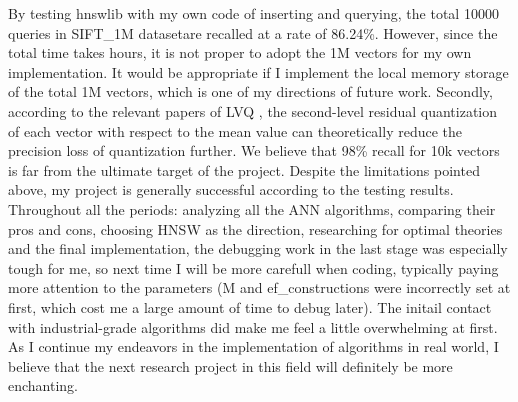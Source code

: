 \documentclass[sigconf, nonacm]{acmart}
\begin{document}
By testing hnswlib with my own code of inserting and querying, the total 10000 queries in SIFT\_1M datasetare recalled at a rate of 86.24\%. However, since the total time takes hours, it is not proper to adopt the 1M vectors for my own implementation. It would be appropriate if I implement the local memory storage of the total 1M vectors, which is one of my directions of future work.
Secondly, according to the relevant papers of LVQ \cite{aguerrebere2023similarity}, the second-level residual quantization of each vector with respect to the mean value can theoretically reduce the precision loss of quantization further. We believe that 98\% recall for 10k vectors is far from the ultimate target of the project.
Despite the limitations pointed above, my project is generally successful according to the testing results. Throughout all the periods: analyzing all the ANN algorithms, comparing their pros and cons, choosing HNSW as the direction, researching for optimal theories and the final implementation, the debugging work in the last stage was especially tough for me, so next time I will be more carefull when coding, typically paying more attention to the parameters (M and ef\_constructions were incorrectly set at first, which cost me a large amount of time to debug later). The initail contact with industrial-grade algorithms did make me feel a little overwhelming at first. As I continue my endeavors in the implementation of algorithms in real world, I believe that the next research project in this field will definitely be more enchanting.




\end{document}
